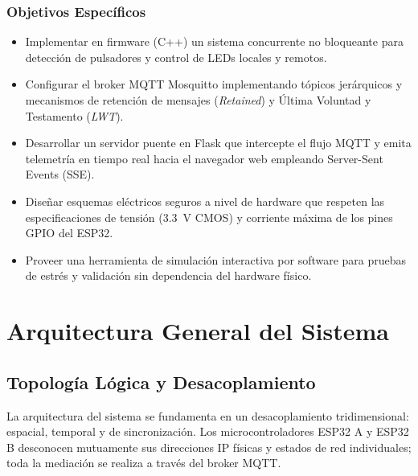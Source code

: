 \documentclass[11pt,a4paper]{article}
\begin{document}
\subsubsection{Objetivos Específicos}
\begin{itemize}
    \item Implementar en firmware (C++) un sistema concurrente no bloqueante para detección de pulsadores y control de LEDs locales y remotos.
    \item Configurar el broker MQTT Mosquitto implementando tópicos jerárquicos y mecanismos de retención de mensajes (\textit{Retained}) y Última Voluntad y Testamento (\textit{LWT}).
    \item Desarrollar un servidor puente en Flask que intercepte el flujo MQTT y emita telemetría en tiempo real hacia el navegador web empleando Server-Sent Events (SSE).
    \item Diseñar esquemas eléctricos seguros a nivel de hardware que respeten las especificaciones de tensión (3.3~V CMOS) y corriente máxima de los pines GPIO del ESP32.
    \item Proveer una herramienta de simulación interactiva por software para pruebas de estrés y validación sin dependencia del hardware físico.
\end{itemize}

\section{Arquitectura General del Sistema}

\subsection{Topología Lógica y Desacoplamiento}
La arquitectura del sistema se fundamenta en un desacoplamiento tridimensional: espacial, temporal y de sincronización. Los microcontroladores ESP32 A y ESP32 B desconocen mutuamente sus direcciones IP físicas y estados de red individuales; toda la mediación se realiza a través del broker MQTT.
\end{document}
